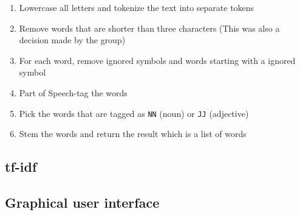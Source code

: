 \begin{enumerate}
    \item Lowercase all letters and tokenize the text into separate tokens
    \item Remove words that are shorter than three characters (This was also a
          decision made by the group)
    \item For each word, remove ignored symbols and words starting with a
	    ignored symbol
    \item Part of Speech-tag \cite{pos} the words
    \item Pick the words that are tagged as \texttt{NN} (noun) or \texttt{JJ}
        (adjective)
    \item Stem the words and return the result which is a list of words
\end{enumerate}



\subsection{tf-idf}



\subsection{Graphical user interface}
